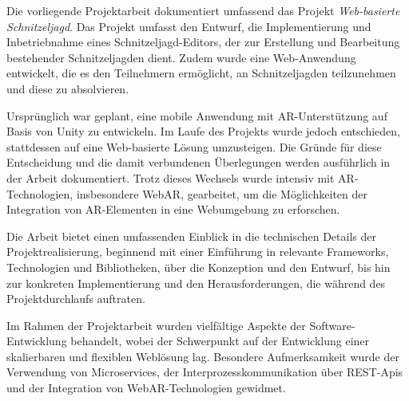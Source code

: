 Die vorliegende Projektarbeit dokumentiert umfassend das Projekt \textit{Web-basierte Schnitzeljagd}. Das Projekt umfasst den Entwurf, die Implementierung und Inbetriebnahme eines Schnitzeljagd-Editors, der zur Erstellung und Bearbeitung bestehender Schnitzeljagden dient. Zudem wurde eine Web-Anwendung entwickelt, die es den Teilnehmern ermöglicht, an Schnitzeljagden teilzunehmen und diese zu absolvieren.

Ursprünglich war geplant, eine mobile Anwendung mit AR-Unterstützung auf Basis von Unity zu entwickeln. Im Laufe des Projekts wurde jedoch entschieden, stattdessen auf eine Web-basierte Lösung umzusteigen. Die Gründe für diese Entscheidung und die damit verbundenen Überlegungen werden ausführlich in der Arbeit dokumentiert. Trotz dieses Wechsels wurde intensiv mit AR-Technologien, insbesondere WebAR, gearbeitet, um die Möglichkeiten der Integration von AR-Elementen in eine Webumgebung zu erforschen.

Die Arbeit bietet einen umfassenden Einblick in die technischen Details der Projektrealisierung, beginnend mit einer Einführung in relevante Frameworks, Technologien und Bibliotheken, über die Konzeption und den Entwurf, bis hin zur konkreten Implementierung und den Herausforderungen, die während des Projektdurchlaufs auftraten.

Im Rahmen der Projektarbeit wurden vielfältige Aspekte der Software-Entwicklung behandelt, wobei der Schwerpunkt auf der Entwicklung einer skalierbaren und flexiblen Weblösung lag. Besondere Aufmerksamkeit wurde der Verwendung von Microservices, der Interprozesskommunikation über REST-Apis und der Integration von WebAR-Technologien gewidmet.

